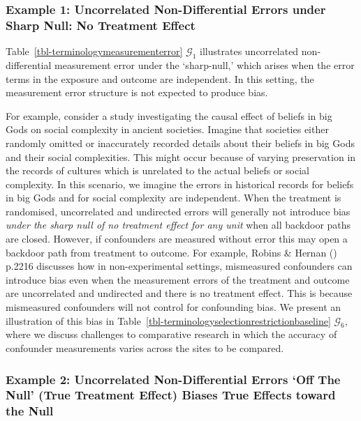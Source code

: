 \documentclass[
  single column]{article}
\begin{document}
\subsubsection{Example 1: Uncorrelated Non-Differential Errors under
Sharp Null: No Treatment
Effect}\label{example-1-uncorrelated-non-differential-errors-under-sharp-null-no-treatment-effect}

Table~\ref{tbl-terminologymeasurementerror} \(\mathcal{G}_1\)
illustrates uncorrelated non-differential measurement error under the
`sharp-null,' which arises when the error terms in the exposure and
outcome are independent. In this setting, the measurement error
structure is not expected to produce bias.

For example, consider a study investigating the causal effect of beliefs
in big Gods on social complexity in ancient societies. Imagine that
societies either randomly omitted or inaccurately recorded details about
their beliefs in big Gods and their social complexities. This might
occur because of varying preservation in the records of cultures which
is unrelated to the actual beliefs or social complexity. In this
scenario, we imagine the errors in historical records for beliefs in big
Gods and for social complexity are independent. When the treatment is
randomised, uncorrelated and undirected errors will generally not
introduce bias \emph{under the sharp null of no treatment effect for any
unit} when all backdoor paths are closed. However, if confounders are
measured without error this may open a backdoor path from treatment to
outcome. For example, Robins \& Hernan
() p.2216 discusses how in
non-experimental settings, mismeasured confounders can introduce bias
even when the measurement errors of the treatment and outcome are
uncorrelated and undirected and there is no treatment effect. This is
because mismeasured confounders will not control for confounding bias.
We present an illustration of this bias in
Table~\ref{tbl-terminologyselectionrestrictionbaseline}
\(\mathcal{G}_6\), where we discuss challenges to comparative research
in which the accuracy of confounder measurements varies across the sites
to be compared.

\subsubsection{Example 2: Uncorrelated Non-Differential Errors `Off The
Null' (True Treatment Effect) Biases True Effects toward the
Null}\label{example-2-uncorrelated-non-differential-errors-off-the-null-true-treatment-effect-biases-true-effects-toward-the-null}
\end{document}
